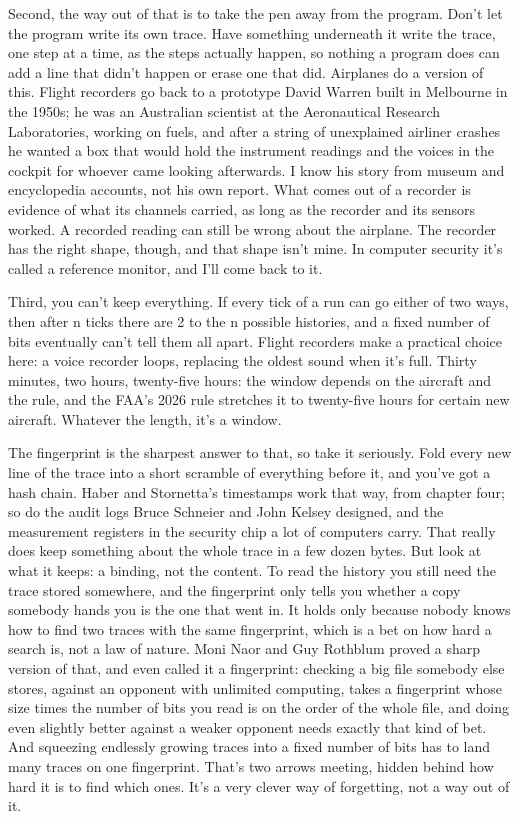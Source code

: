 \documentclass[11pt,twoside]{article}
\theoremstyle{thielethm}
\theoremstyle{thieledef}
\theoremstyle{thieledef}
\theoremstyle{thieledef}
\theoremstyle{thielethm}
\theoremstyle{thieleobs}
\theoremstyle{thielethm}
\begin{document}
Second, the way out of that is to take the pen away from the program. Don't let the program write its own trace. Have something underneath it write the trace, one step at a time, as the steps actually happen, so nothing a program does can add a line that didn't happen or erase one that did. Airplanes do a version of this. Flight recorders go back to a prototype David Warren built in Melbourne in the 1950s; he was an Australian scientist at the Aeronautical Research Laboratories, working on fuels, and after a string of unexplained airliner crashes he wanted a box that would hold the instrument readings and the voices in the cockpit for whoever came looking afterwards. I know his story from museum and encyclopedia accounts, not his own report. What comes out of a recorder is evidence of what its channels carried, as long as the recorder and its sensors worked. A recorded reading can still be wrong about the airplane. The recorder has the right shape, though, and that shape isn't mine. In computer security it's called a reference monitor, and I'll come back to it.

Third, you can't keep everything. If every tick of a run can go either of two ways, then after n ticks there are 2 to the n possible histories, and a fixed number of bits eventually can't tell them all apart. Flight recorders make a practical choice here: a voice recorder loops, replacing the oldest sound when it's full. Thirty minutes, two hours, twenty-five hours: the window depends on the aircraft and the rule, and the FAA's 2026 rule stretches it to twenty-five hours for certain new aircraft. Whatever the length, it's a window.

The fingerprint is the sharpest answer to that, so take it seriously. Fold every new line of the trace into a short scramble of everything before it, and you've got a hash chain. Haber and Stornetta's timestamps work that way, from chapter four; so do the audit logs Bruce Schneier and John Kelsey designed, and the measurement registers in the security chip a lot of computers carry. That really does keep something about the whole trace in a few dozen bytes. But look at what it keeps: a binding, not the content. To read the history you still need the trace stored somewhere, and the fingerprint only tells you whether a copy somebody hands you is the one that went in. It holds only because nobody knows how to find two traces with the same fingerprint, which is a bet on how hard a search is, not a law of nature. Moni Naor and Guy Rothblum proved a sharp version of that, and even called it a fingerprint: checking a big file somebody else stores, against an opponent with unlimited computing, takes a fingerprint whose size times the number of bits you read is on the order of the whole file, and doing even slightly better against a weaker opponent needs exactly that kind of bet. And squeezing endlessly growing traces into a fixed number of bits has to land many traces on one fingerprint. That's two arrows meeting, hidden behind how hard it is to find which ones. It's a very clever way of forgetting, not a way out of it.
\end{document}
